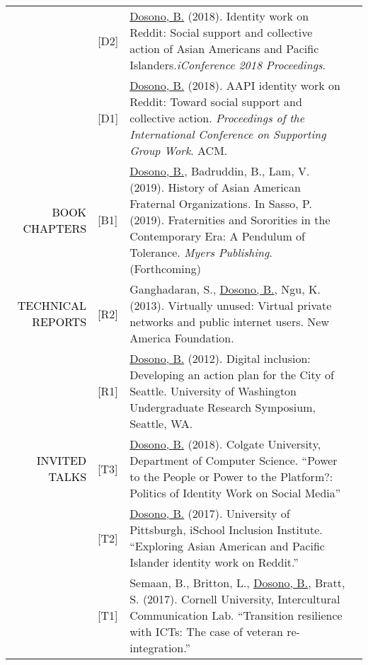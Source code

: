 \documentclass[12pt]{article}
\begin{document}
{{\begin{longtable}{Rp{1.0in}p{0.25in}p{4.75in}}
& \footnotesize{[D2]} & \href{http://ischools.org/the-iconference/program/doctoral-colloquium/2018-doctoral-colloquium/}{{Dosono, B.}} (2018). Identity work on Reddit: Social support and collective action of Asian Americans and Pacific Islanders.\textit{iConference 2018 Proceedings}. \\

& \footnotesize{[D1]} & \href{https://dl.acm.org/authorize?N42808}{{Dosono, B.}} (2018). AAPI identity work on Reddit: Toward social support and collective action. \textit{Proceedings of the International Conference on Supporting Group Work}. ACM. \\

\textcolor{black}{\footnotesize{\uppercase{Book Chapters}}} & \footnotesize{[B1]} & \href{http://myersedpress.com/BookDetail.aspx?productID=536594}{{Dosono, B.}}, Badruddin, B., Lam, V. (2019). History of Asian American Fraternal Organizations. In Sasso, P. (2019). Fraternities and Sororities in the Contemporary Era: A Pendulum of Tolerance. \textit{Myers Publishing}. (Forthcoming) \\

\textcolor{black}{\footnotesize{\uppercase{Technical Reports}}} & \footnotesize{[R2]} & Ganghadaran, S., \href{http://newamerica.net/publications/policy/virtually_unused}{{Dosono, B.}}, Ngu, K. (2013). Virtually unused: Virtual private networks and public internet users. New America Foundation. \\

& \footnotesize{[R1]} & \href{http://youtu.be/Xob0hWqZQgU}{{Dosono, B.}} (2012). Digital inclusion: Developing an action plan for the City of Seattle. University of Washington Undergraduate Research Symposium, Seattle, WA. \\

\textcolor{black}{\footnotesize{\uppercase{Invited Talks}}} & \footnotesize{[T3]} & \href{https://cs.colgate.edu/cs/events/151/}{{Dosono, B.}} (2018). Colgate University, Department of Computer Science. ``Power to the People or Power to the Platform?: Politics of Identity Work on Social Media'' \\

& \footnotesize{[T2]} & \href{http://www.sis.pitt.edu/i3/i3-cohorts/2017/schedule.html}{{Dosono, B.}} (2017). University of Pittsburgh, iSchool Inclusion Institute. ``Exploring Asian American and Pacific Islander identity work on Reddit.'' \\

& \footnotesize{[T1]} & Semaan, B., Britton, L., \href{http://bit.ly/CornellTalk}{{Dosono, B.}}, Bratt, S. (2017). Cornell University, Intercultural Communication Lab. ``Transition resilience with ICTs: The case of veteran re-integration.'' \\


\end{longtable}}}
\end{document}
